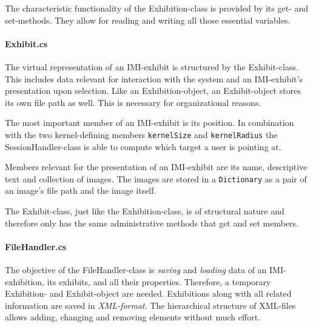 The characteristic functionality of the Exhibition-class is provided by its get- and set-methods. They allow for reading and writing all those essential variables.


\paragraph{Exhibit.cs} The virtual representation of an \ac{IMI}-exhibit is structured by the Exhibit-class. This includes data relevant for interaction with the system and an \ac{IMI}-exhibit's presentation upon selection. Like an Exhibition-object, an Exhibit-object stores its own file path as well. This is necessary for organizational reasons. 

The most important member of an \ac{IMI}-exhibit is its position. In combination with the two kernel-defining members \texttt{kernelSize} and \texttt{kernelRadius} the SessionHandler-class is able to compute which target a user is pointing at.  

Members relevant for the presentation of an \ac{IMI}-exhibit are its name, descriptive text and collection of images. The images are stored in a \texttt{Dictionary} as a pair of an image's file path and the image itself. 

The Exhibit-class, just like the Exhibition-class, is of structural nature and therefore only has the same administrative methods that get and set members.


\paragraph{FileHandler.cs} The objective of the FileHandler-class is \textit{saving} and \textit{loading} data of an \ac{IMI}-exhibition, its exhibits, and all their properties. Therefore, a temporary Exhibition- and Exhibit-object are needed. Exhibitions along with all related information are saved in \textit{XML-format}. The hierarchical structure of XML-files allows adding, changing and removing elements without much effort. 

